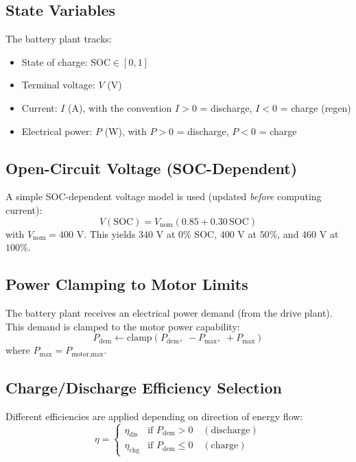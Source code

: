 \documentclass[11pt,a4paper]{article}
\begin{document}
\subsection{State Variables}
The battery plant tracks:
\begin{itemize}
    \item State of charge: $\mathrm{SOC} \in [0,1]$
    \item Terminal voltage: $V$ (V)
    \item Current: $I$ (A), with the convention $I>0$ = discharge, $I<0$ = charge (regen)
    \item Electrical power: $P$ (W), with $P>0$ = discharge, $P<0$ = charge
\end{itemize}

\subsection{Open-Circuit Voltage (SOC-Dependent)}
A simple SOC-dependent voltage model is used (updated \emph{before} computing current):
\begin{equation}
V(\mathrm{SOC}) = V_{\text{nom}} \left(0.85 + 0.30\,\mathrm{SOC}\right)
\label{eq:batt_voltage_soc}
\end{equation}
with $V_{\text{nom}} = 400$ V. This yields $340$ V at $0\%$ SOC, $400$ V at $50\%$, and $460$ V at $100\%$.

\subsection{Power Clamping to Motor Limits}
The battery plant receives an electrical power demand (from the drive plant). This demand is clamped to the motor power capability:
\begin{equation}
P_{\text{dem}} \leftarrow \mathrm{clamp}\!\left(P_{\text{dem}},\; -P_{\max},\; +P_{\max}\right)
\label{eq:batt_power_clamp}
\end{equation}
where $P_{\max} = P_{\text{motor,max}}$.

\subsection{Charge/Discharge Efficiency Selection}
Different efficiencies are applied depending on direction of energy flow:
\begin{equation}
\eta =
\begin{cases}
\eta_{\text{dis}} & \text{if } P_{\text{dem}} > 0 \quad (\text{discharge})\\
\eta_{\text{chg}} & \text{if } P_{\text{dem}} \le 0 \quad (\text{charge})
\end{cases}
\label{eq:batt_eff_select}
\end{equation}
\end{document}
